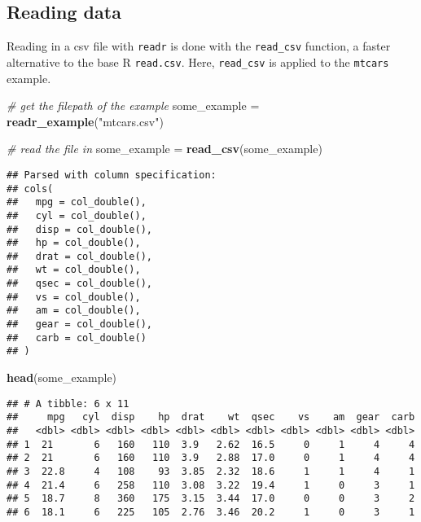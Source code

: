 \documentclass[
]{book}
\newenvironment{Shaded}{}{}
\newcommand{\CommentTok}[1]{\textcolor[rgb]{0.38,0.63,0.69}{\textit{#1}}}
\newcommand{\KeywordTok}[1]{\textcolor[rgb]{0.00,0.44,0.13}{\textbf{#1}}}
\newcommand{\NormalTok}[1]{#1}
\newcommand{\StringTok}[1]{\textcolor[rgb]{0.25,0.44,0.63}{#1}}
\begin{document}
\hypertarget{reading-data}{%
\subsection{Reading data}\label{reading-data}}

Reading in a csv file with \texttt{readr} is done with the \texttt{read\_csv} function, a faster alternative to the base R \texttt{read.csv}. Here, \texttt{read\_csv} is applied to the \texttt{mtcars} example.

\begin{Shaded}
\begin{Highlighting}[]
\CommentTok{# get the filepath of the example}
\NormalTok{some_example =}\StringTok{ }\KeywordTok{readr_example}\NormalTok{(}\StringTok{"mtcars.csv"}\NormalTok{)}

\CommentTok{# read the file in}
\NormalTok{some_example =}\StringTok{ }\KeywordTok{read_csv}\NormalTok{(some_example)}
\end{Highlighting}
\end{Shaded}

\begin{verbatim}
## Parsed with column specification:
## cols(
##   mpg = col_double(),
##   cyl = col_double(),
##   disp = col_double(),
##   hp = col_double(),
##   drat = col_double(),
##   wt = col_double(),
##   qsec = col_double(),
##   vs = col_double(),
##   am = col_double(),
##   gear = col_double(),
##   carb = col_double()
## )
\end{verbatim}

\begin{Shaded}
\begin{Highlighting}[]
\KeywordTok{head}\NormalTok{(some_example)}
\end{Highlighting}
\end{Shaded}

\begin{verbatim}
## # A tibble: 6 x 11
##     mpg   cyl  disp    hp  drat    wt  qsec    vs    am  gear  carb
##   <dbl> <dbl> <dbl> <dbl> <dbl> <dbl> <dbl> <dbl> <dbl> <dbl> <dbl>
## 1  21       6   160   110  3.9   2.62  16.5     0     1     4     4
## 2  21       6   160   110  3.9   2.88  17.0     0     1     4     4
## 3  22.8     4   108    93  3.85  2.32  18.6     1     1     4     1
## 4  21.4     6   258   110  3.08  3.22  19.4     1     0     3     1
## 5  18.7     8   360   175  3.15  3.44  17.0     0     0     3     2
## 6  18.1     6   225   105  2.76  3.46  20.2     1     0     3     1
\end{verbatim}
\end{document}
